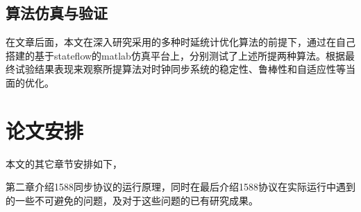 \subsection{算法仿真与验证}
在文章后面，本文在深入研究采用的多种时延统计优化算法的前提下，通过在自己搭建的基于stateflow的matlab仿真平台上，分别测试了上述所提两种算法。根据最终试验结果表现来观察所提算法对时钟同步系统的稳定性、鲁棒性和自适应性等当面的优化。


\section{论文安排}
本文的其它章节安排如下，

第二章介绍1588同步协议的运行原理，同时在最后介绍1588协议在实际运行中遇到的一些不可避免的问题，及对于这些问题的已有研究成果。

